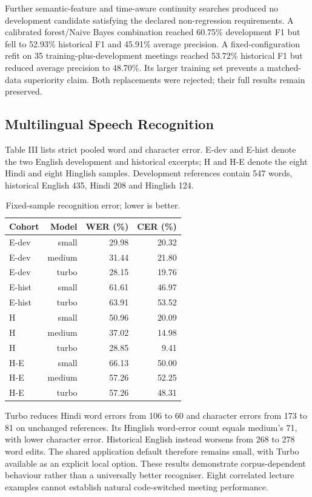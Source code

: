 \documentclass[conference,a4paper]{IEEEtran}
\begin{document}
Further semantic-feature and time-aware continuity searches produced no development candidate satisfying the declared non-regression requirements. A calibrated forest/Naive Bayes combination reached 60.75\% development F1 but fell to 52.93\% historical F1 and 45.91\% average precision. A fixed-configuration refit on 35 training-plus-development meetings reached 53.72\% historical F1 but reduced average precision to 48.70\%. Its larger training set prevents a matched-data superiority claim. Both replacements were rejected; their full results remain preserved.

\subsection{Multilingual Speech Recognition}
Table III lists strict pooled word and character error. E-dev and E-hist denote the two English development and historical excerpts; H and H-E denote the eight Hindi and eight Hinglish samples. Development references contain 547 words, historical English 435, Hindi 208 and Hinglish 124.

\begin{table}[t]
\caption{Fixed-sample recognition error; lower is better.}
\centering\footnotesize
\setlength{\tabcolsep}{2pt}
\begin{tabular}{p{}rrr}
\toprule
Cohort & Model & WER (\%) & CER (\%) \\
\midrule
E-dev & small & 29.98 & 20.32 \\
E-dev & medium & 31.44 & 21.80 \\
E-dev & turbo & 28.15 & 19.76 \\
E-hist & small & 61.61 & 46.97 \\
E-hist & turbo & 63.91 & 53.52 \\
H & small & 50.96 & 20.09 \\
H & medium & 37.02 & 14.98 \\
H & turbo & 28.85 & 9.41 \\
H-E & small & 66.13 & 50.00 \\
H-E & medium & 57.26 & 52.25 \\
H-E & turbo & 57.26 & 48.31 \\
\bottomrule
\end{tabular}
\end{table}
Turbo reduces Hindi word errors from 106 to 60 and character errors from 173 to 81 on unchanged references. Its Hinglish word-error count equals medium's 71, with lower character error. Historical English instead worsens from 268 to 278 word edits. The shared application default therefore remains small, with Turbo available as an explicit local option. These results demonstrate corpus-dependent behaviour rather than a universally better recogniser. Eight correlated lecture examples cannot establish natural code-switched meeting performance.
\end{document}
